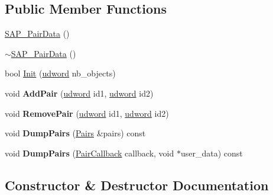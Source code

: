 \subsection*{Public Member Functions}
\begin{DoxyCompactItemize}
\item 
\hyperlink{classOpcode_1_1SAP__PairData_a84e9239e2403341cac7ad00dc09487bd}{S\+A\+P\+\_\+\+Pair\+Data} ()
\item 
\hyperlink{classOpcode_1_1SAP__PairData_af80f9b6da8804fcefae5b3408979bc8f}{$\sim$\+S\+A\+P\+\_\+\+Pair\+Data} ()
\item 
bool \hyperlink{classOpcode_1_1SAP__PairData_ae83191ac5b9f1084b9280c1be61f4d47}{Init} (\hyperlink{IceTypes_8h_a44c6f1920ba5551225fb534f9d1a1733}{udword} nb\+\_\+objects)
\item 
void {\bfseries Add\+Pair} (\hyperlink{IceTypes_8h_a44c6f1920ba5551225fb534f9d1a1733}{udword} id1, \hyperlink{IceTypes_8h_a44c6f1920ba5551225fb534f9d1a1733}{udword} id2)\hypertarget{classOpcode_1_1SAP__PairData_a95cd61aec2388f8afc65095961fdb097}{}\label{classOpcode_1_1SAP__PairData_a95cd61aec2388f8afc65095961fdb097}

\item 
void {\bfseries Remove\+Pair} (\hyperlink{IceTypes_8h_a44c6f1920ba5551225fb534f9d1a1733}{udword} id1, \hyperlink{IceTypes_8h_a44c6f1920ba5551225fb534f9d1a1733}{udword} id2)\hypertarget{classOpcode_1_1SAP__PairData_a84609c97cc960c770d7946a4f36a9ef6}{}\label{classOpcode_1_1SAP__PairData_a84609c97cc960c770d7946a4f36a9ef6}

\item 
void {\bfseries Dump\+Pairs} (\hyperlink{classPairs}{Pairs} \&pairs) const \hypertarget{classOpcode_1_1SAP__PairData_ae04919507b1fce5341800bb5ed22f8e5}{}\label{classOpcode_1_1SAP__PairData_ae04919507b1fce5341800bb5ed22f8e5}

\item 
void {\bfseries Dump\+Pairs} (\hyperlink{OPC__SweepAndPrune_8h_a4609c7fbc34f117277b8b563bfb2d582}{Pair\+Callback} callback, void $\ast$user\+\_\+data) const \hypertarget{classOpcode_1_1SAP__PairData_a3eadd5031707b2ddfb2a2b56e0482190}{}\label{classOpcode_1_1SAP__PairData_a3eadd5031707b2ddfb2a2b56e0482190}

\end{DoxyCompactItemize}


\subsection{Constructor \& Destructor Documentation}
